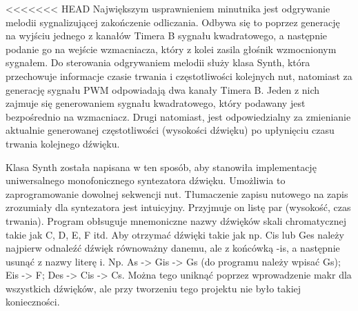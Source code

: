 \documentclass[fleqn]{article}
\begin{document}
<<<<<<< HEAD
Największym usprawnieniem minutnika jest odgrywanie melodii sygnalizującej zakończenie odliczania. Odbywa się to poprzez generację na wyjściu jednego z kanałów Timera B sygnału kwadratowego, a następnie podanie go na wejście wzmacniacza, który z kolei zasila głośnik wzmocnionym sygnałem. Do sterowania odgrywaniem melodii służy klasa Synth, która przechowuje informacje czasie trwania i częstotliwości kolejnych nut, natomiast za generację sygnału PWM odpowiadają dwa kanały Timera B. Jeden z nich zajmuje się generowaniem sygnału kwadratowego, który podawany jest bezpośrednio na wzmacniacz. Drugi natomiast, jest odpowiedzialny za zmienianie aktualnie generowanej częstotliwości (wysokości dźwięku) po upłynięciu czasu trwania kolejnego dźwięku.

Klasa Synth została napisana w ten sposób, aby stanowiła implementację uniwersalnego monofonicznego syntezatora dźwięku. Umożliwia to zaprogramowanie dowolnej sekwencji nut. Tłumaczenie zapisu nutowego na zapis zrozumiały dla syntezatora jest intuicyjny. Przyjmuje on listę par (wysokość, czas trwania). Program obłsuguje mnemoniczne nazwy dźwięków skali chromatycznej takie jak C, D, E, F itd. Aby otrzymać dźwięki takie jak np. Cis lub Ges należy najpierw odnaleźć dźwięk równoważny danemu, ale z końcówką -is, a następnie usunąć z nazwy literę i. Np. As -> Gis -> Gs (do programu należy wpisać Gs); Eis -> F; Des -> Cis -> Cs. Można tego uniknąć poprzez wprowadzenie makr dla wszystkich dźwięków, ale przy tworzeniu tego projektu nie było takiej konieczności.
\end{document}
